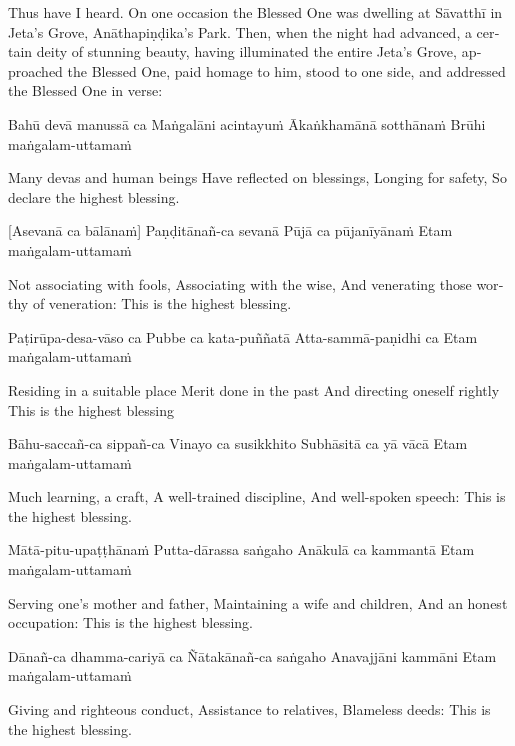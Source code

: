 \begin{english}
Thus have I heard. On one occasion the Blessed One was dwelling at Sāvatthī in Jeta’s Grove, Anāthapiṇḍika’s Park. Then, when the night had advanced, a certain deity of stunning beauty, having illuminated the entire Jeta’s Grove, approached the Blessed One, paid homage to him, stood to one side, and addressed the Blessed One in verse:
\begin{english}

Bahū devā manussā ca
Maṅgalāni acintayuṁ
Ākaṅkhamānā sotthānaṁ
Brūhi maṅgalam-uttamaṁ

\begin{english}
Many devas and human beings
Have reflected on blessings,
Longing for safety,
So declare the highest blessing.
\end{english}

[Asevanā ca bālānaṁ]
Paṇḍitānañ-ca sevanā
Pūjā ca pūjanīyānaṁ
Etam maṅgalam-uttamaṁ

\begin{english}
Not associating with fools,
Associating with the wise,
And venerating those worthy of veneration:
This is the highest blessing.
\end{english}

Paṭirūpa-desa-vāso ca
Pubbe ca kata-puññatā
Atta-sammā-paṇidhi ca
Etam maṅgalam-uttamaṁ

\begin{english}
Residing in a suitable place
Merit done in the past
And directing oneself rightly
This is the highest blessing
\end{english}

Bāhu-saccañ-ca sippañ-ca
Vinayo ca susikkhito
Subhāsitā ca yā vācā
Etam maṅgalam-uttamaṁ

\begin{english}
Much learning, a craft,
A well-trained discipline,
And well-spoken speech:
This is the highest blessing.
\end{english}

Mātā-pitu-upaṭṭhānaṁ
Putta-dārassa saṅgaho
Anākulā ca kammantā
Etam maṅgalam-uttamaṁ

\begin{english}
Serving one’s mother and father,
Maintaining a wife and children,
And an honest occupation:
This is the highest blessing.
\end{english}

Dānañ-ca dhamma-cariyā ca
Ñātakānañ-ca saṅgaho
Anavajjāni kammāni
Etam maṅgalam-uttamaṁ

\begin{english}
Giving and righteous conduct,
Assistance to relatives,
Blameless deeds:
This is the highest blessing.
\end{english}


\end{english}
\end{english}
